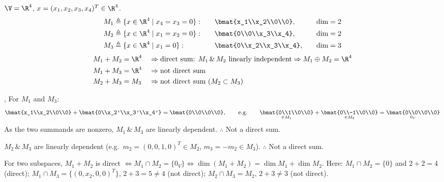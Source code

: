 \begin{example}
$\V=\R^4$, \quad $x=(x_1,x_2,x_3,x_4)^T\in\R^4$.
\begin{alignat*}{3}
M_1&\triangleq\{x\in\R^4\mid x_4=x_3=0\}: &\quad &\bmat{x_1\\x_2\\0\\0}, &\quad \dim&=2\\
M_2&\triangleq\{x\in\R^4\mid x_1=x_2=0\}: & &\bmat{0\\0\\x_3\\x_4}, & \dim&=2\\
M_3&\triangleq\{x\in\R^4\mid x_1=0\}: & &\bmat{0\\x_2\\x_3\\x_4}, & \dim&=3
\end{alignat*}
\begin{align*}
M_1+M_2&=\R^4 && \Rightarrow \text{direct sum: } M_1\,\&\,M_2 \text{ linearly independent} \Rightarrow M_1\oplus M_2=\R^4\\
M_1+M_3&=\R^4 && \Rightarrow \text{not direct sum}\\
M_2+M_3&=M_3 && \Rightarrow \text{not direct sum } (M_2\subset M_3)
\end{align*}

\sep
For $M_1$ and $M_3$:
\[
\bmat{x_1\\x_2\\0\\0}+\bmat{0\\x_2'\\x_3'\\x_4'}=\bmat{0\\0\\0\\0},
\qquad\text{e.g.}\qquad
\underset{\in M_1}{\bmat{0\\1\\0\\0}}+\underset{\in M_3}{\bmat{0\\-1\\0\\0}}=\underset{0_V}{\bmat{0\\0\\0\\0}}
\]
As the two summands are nonzero, $M_1\,\&\,M_3$ are linearly dependent. $\therefore$ Not a direct sum.

$M_2\,\&\,M_3$ are linearly dependent (e.g.\ $m_2=(0,0,1,0)^T\in M_2$, $m_3=-m_2\in M_3$). $\therefore$ Not a direct sum.
\begin{insight}
For two subspaces, $M_1+M_2$ is direct $\iff M_1\cap M_2=\{0_V\}\iff\dim(M_1+M_2)=\dim M_1+\dim M_2$. Here: $M_1\cap M_2=\{0\}$ and $2+2=4$ (direct); $M_1\cap M_3=\{(0,x_2,0,0)^T\}$, $2+3=5\ne4$ (not direct); $M_2\cap M_3=M_2$, $2+3\ne3$ (not direct).
\end{insight}
\end{example}

